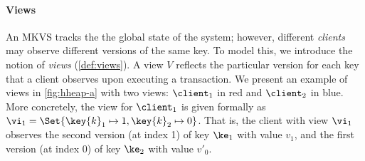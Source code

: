 


\paragraph{Views}
An MKVS tracks the the global state of the system; however, different \emph{clients} may observe different versions of the same key. 
To model this, we introduce the notion of \emph{views} (\cref{def:views}). 
A view $V$ reflects the particular version for each key that a client observes upon executing a transaction. 
We present an example of views in \cref{fig:hheap-a} with two views: $\client_1$ in red and $\client_2$ in blue.
More concretely, the view for \( \client_1 \) is given formally as $\vi_1 = \Set{\key{k}_1 \mapsto 1, \key{k}_2 \mapsto 0}$.
That is, the client with view $\vi_1$ observes the second version (at index 1) of key \( \ke_{1} \) with value $v_1$, and the first version (at index 0) of key \( \ke_2 \) with value $v'_0$.

